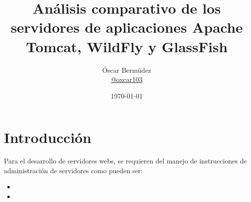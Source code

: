 \documentclass[12pt, aspectratio=169]{beamer} %
\title[Análisis de TC, WF y GF]{Análisis comparativo de los servidores de aplicaciones
Apache Tomcat, WildFly y GlassFish} %
\author[Óscar Bermúdez]{
	Óscar Bermúdez\\	
	\href{http://www.github.com/oxcar103}{@oxcar103}
} %
\institute[UGR] %
{
  Universidad de Granada \\ %
}
\date{\today} %
\begin{document}
\begin{frame}
	\titlepage %
\end{frame}




\section{Introducción}
	\begin{frame}
		Para el desarrollo de servidores webs, se requieren del manejo de instrucciones de administración
		de servidores como pueden ser:
		
		\begin{itemize}
			\item {}
			

			\item {}
			
			

\end{itemize}
\end{frame}
\end{document}
